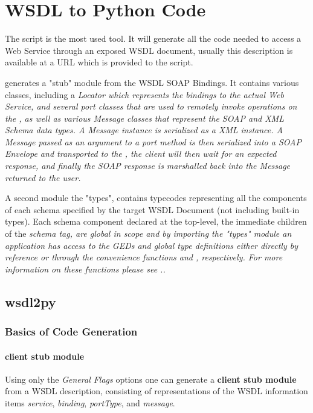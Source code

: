 \chapter{WSDL to Python Code}

The \WPY script is the most used tool.  It will generate all the
code needed to access a Web Service through an exposed WSDL document, usually
this description is available at a URL which is provided to the script. 

\WPY generates a "stub" module from the WSDL SOAP Bindings.  It contains various
classes, including a \it{Locator} which represents the bindings to the actual
Web Service, and several \it{port} classes that are used to remotely invoke 
operations on the \WS, as well as various \it{Message} classes that
represent the SOAP and XML Schema data types.  A \it{Message} instance is
serialized as a XML instance.  A \it{Message} passed as an argument to a
\it{port} method is then serialized into a SOAP Envelope and transported to the
\WS, the client will then wait for an expected response, and finally the SOAP
response is marshalled back into the \it{Message} returned to the user.

A second module the "types", contains typecodes representing all the components
of each schema specified by the target WSDL Document (not including built-in
types).  Each schema component declared at the top-level, the immediate children
of the \it{schema} tag, are global in scope and by importing the "types" module
an application has access to the GEDs and global type definitions either
directly by reference or through the convenience functions  and
, respectively.  For more information on these functions please see ..

\section{wsdl2py}

\subsection{Basics of Code Generation}
\label{subsection:Basics of Code Generation}

\subsubsection{client stub module}
Using only the {\it General Flags} options one can generate a 
{\bfseries client stub module} from a WSDL description, consisting of
representations of the WSDL information items {\it service}, {\it binding}, 
{\it portType}, and {\it message}.

